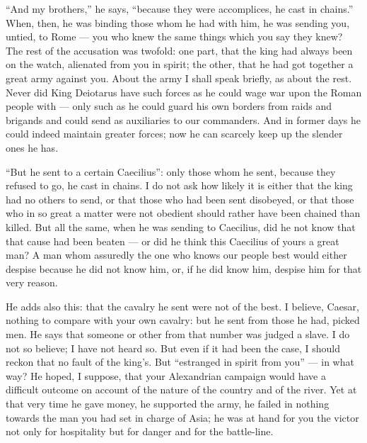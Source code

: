  ``And my brothers,'' he says, ``because they were accomplices, he cast in chains.'' When, then, he was binding those whom he had with him, he was sending you, untied, to Rome --- you who knew the same things which you say they knew? The rest of the accusation was twofold: one part, that the king had always been on the watch, alienated from you in spirit; the other, that he had got together a great army against you. About the army I shall speak briefly, as about the rest. Never did King Deiotarus have such forces as he could wage war upon the Roman people with --- only such as he could guard his own borders from raids and brigands and could send as auxiliaries to our commanders. And in former days he could indeed maintain greater forces; now he can scarcely keep up the slender ones he has.

 ``But he sent to a certain Caecilius'': only those whom he sent, because they refused to go, he cast in chains. I do not ask how likely it is either that the king had no others to send, or that those who had been sent disobeyed, or that those who in so great a matter were not obedient should rather have been chained than killed. But all the same, when he was sending to Caecilius, did he not know that that cause had been beaten --- or did he think this Caecilius of yours a great man? A man whom assuredly the one who knows our people best would either despise because he did not know him, or, if he did know him, despise him for that very reason.

 He adds also this: that the cavalry he sent were not of the best. I believe, Caesar, nothing to compare with your own cavalry: but he sent from those he had, picked men. He says that someone or other from that number was judged a slave. I do not so believe; I have not heard so. But even if it had been the case, I should reckon that no fault of the king's. But ``estranged in spirit from you'' --- in what way? He hoped, I suppose, that your Alexandrian campaign would have a difficult outcome on account of the nature of the country and of the river. Yet at that very time he gave money, he supported the army, he failed in nothing towards the man you had set in charge of Asia; he was at hand for you the victor not only for hospitality but for danger and for the battle-line.

